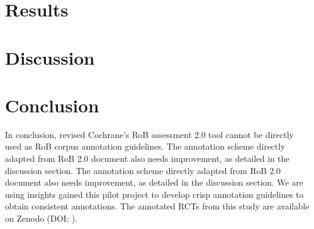 \documentclass{IOS-Book-Article}
\begin{document}
\section{Results}

\section{Discussion}

\section{Conclusion}
\label{sec:conclusion}
%
In conclusion, revised Cochrane's RoB assessment 2.0 tool cannot be directly used as RoB corpus annotation guidelines.
The annotation scheme directly adapted from RoB 2.0 document also needs improvement, as detailed in the discussion section.
The annotation scheme directly adapted from RoB 2.0 document also needs improvement, as detailed in the discussion section.
We are using insights gained this pilot project to develop crisp annotation guidelines to obtain consistent annotations.
The annotated RCTs from this study are available on Zenodo (DOI: ).
%
%
%
 
%
%

%
\end{document}
